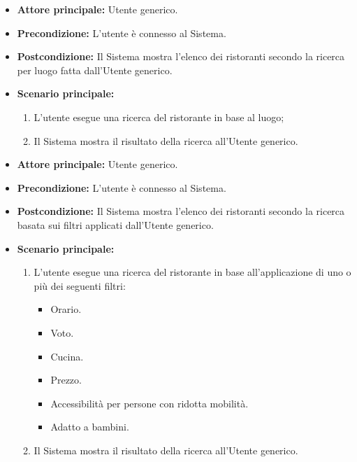 \label{usecase:Ricerca ristoranti per luogo}
\begin{itemize}
	\item \textbf{Attore principale:} Utente generico.
	
	\item \textbf{Precondizione:} L'utente è connesso al Sistema.

	\item \textbf{Postcondizione:} Il Sistema mostra l'elenco dei ristoranti secondo la ricerca per luogo fatta dall'Utente generico.
	      
	\item \textbf{Scenario principale:}
	      \begin{enumerate}
		      \item L'utente esegue una ricerca del ristorante in base al luogo;
		      \item Il Sistema mostra il risultato della ricerca all'Utente generico.
	      \end{enumerate}
\end{itemize}


\label{usecase:Ricerca ristoranti per filtri}
\begin{itemize}
        \item \textbf{Attore principale:} Utente generico.
        
        \item \textbf{Precondizione:} L'utente è connesso al Sistema.
    
        \item \textbf{Postcondizione:} Il Sistema mostra l'elenco dei ristoranti secondo la ricerca basata sui filtri applicati dall'Utente generico.
              
        \item \textbf{Scenario principale:}
              \begin{enumerate}
                  \item L'utente esegue una ricerca del ristorante in base all'applicazione di uno o più dei seguenti filtri:
                  \begin{itemize}
                    \item Orario.
                    \item Voto.
                    \item Cucina.
                    \item Prezzo.
                    \item Accessibilità per persone con ridotta mobilità.
                    \item Adatto a bambini.
                  \end{itemize}
                  \item Il Sistema mostra il risultato della ricerca all'Utente generico.
              \end{enumerate}
\end{itemize}